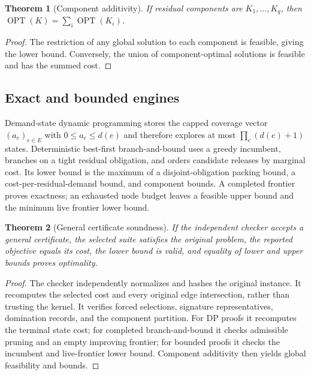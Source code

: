 \documentclass[10pt,conference]{IEEEtran}
\newtheorem{theorem}{Theorem}
\begin{document}
\begin{theorem}[Component additivity]
If residual components are $K_1,\ldots,K_q$, then $\operatorname{OPT}(K)=\sum_i\operatorname{OPT}(K_i)$.
\end{theorem}
\begin{proof}
The restriction of any global solution to each component is feasible, giving the lower bound. Conversely, the union of component-optimal solutions is feasible and has the summed cost.
\end{proof}

\subsection{Exact and bounded engines}
Demand-state dynamic programming stores the capped coverage vector $(a_e)_{e\in E}$ with $0\le a_e\le d(e)$ and therefore explores at most $\prod_e(d(e)+1)$ states. Deterministic best-first branch-and-bound uses a greedy incumbent, branches on a tight residual obligation, and orders candidate releases by marginal cost. Its lower bound is the maximum of a disjoint-obligation packing bound, a cost-per-residual-demand bound, and component bounds. A completed frontier proves exactness; an exhausted node budget leaves a feasible upper bound and the minimum live frontier lower bound.

\begin{theorem}[General certificate soundness]
If the independent checker accepts a general certificate, the selected suite satisfies the original problem, the reported objective equals its cost, the lower bound is valid, and equality of lower and upper bounds proves optimality.
\end{theorem}
\begin{proof}
The checker independently normalizes and hashes the original instance. It recomputes the selected cost and every original edge intersection, rather than trusting the kernel. It verifies forced selections, signature representatives, domination records, and the component partition. For DP proofs it recomputes the terminal state cost; for completed branch-and-bound it checks admissible pruning and an empty improving frontier; for bounded proofs it checks the incumbent and live-frontier lower bound. Component additivity then yields global feasibility and bounds.
\end{proof}
\end{document}
